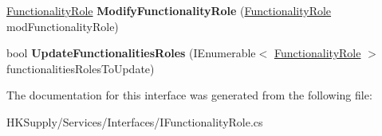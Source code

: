 \begin{DoxyCompactItemize}
\hyperlink{class_h_k_supply_1_1_models_1_1_functionality_role}{Functionality\+Role} {\bfseries Modify\+Functionality\+Role} (\hyperlink{class_h_k_supply_1_1_models_1_1_functionality_role}{Functionality\+Role} mod\+Functionality\+Role)
\item 
\mbox{\label{interface_h_k_supply_1_1_services_1_1_interfaces_1_1_i_functionality_role_a816ae3d8bb97d20aa19d3608d96528e5}} 
bool {\bfseries Update\+Functionalities\+Roles} (I\+Enumerable$<$ \hyperlink{class_h_k_supply_1_1_models_1_1_functionality_role}{Functionality\+Role} $>$ functionalities\+Roles\+To\+Update)
\end{DoxyCompactItemize}


The documentation for this interface was generated from the following file\+:\begin{DoxyCompactItemize}
\item 
H\+K\+Supply/\+Services/\+Interfaces/I\+Functionality\+Role.\+cs\end{DoxyCompactItemize}
